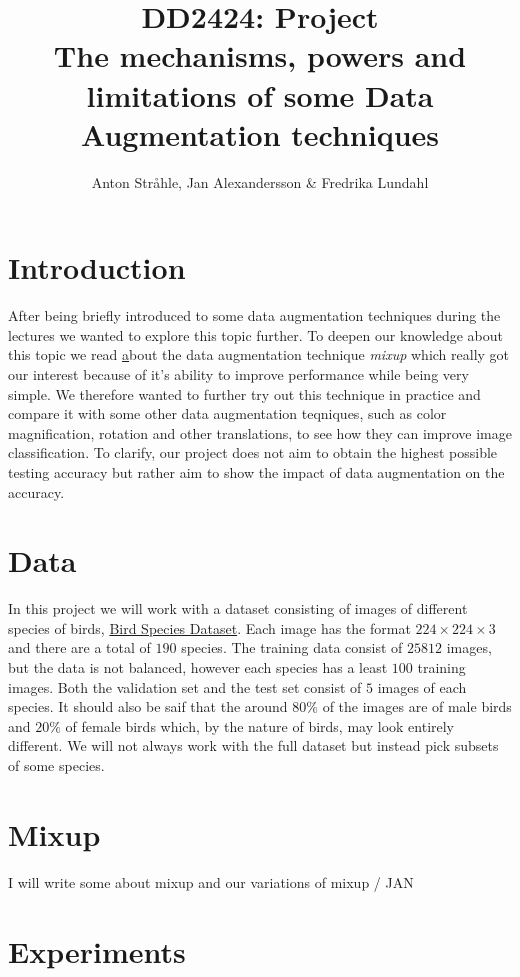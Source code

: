 \documentclass{article}
\begin{document}
\title{DD2424: Project \\
The mechanisms, powers and limitations of some Data Augmentation techniques}

\author{Anton Stråhle, Jan Alexandersson \& Fredrika Lundahl}
\maketitle 

\section{Introduction}

After being briefly introduced to some data augmentation techniques during the lectures we wanted to explore this topic further. 
To deepen our knowledge about this topic we read \href{https://arxiv.org/pdf/1710.09412.pdf} about the data augmentation technique \textit{mixup} which 
really got our interest because of it's ability to improve performance while being very simple. We therefore wanted to further try out this technique 
in practice and compare it with some other data augmentation teqniques, such as color magnification, rotation and other translations, to see how they can improve 
image classification. To clarify, our project does not aim to obtain the highest possible testing accuracy but rather aim to show the impact of data augmentation 
on the accuracy. 

\section{Data}

In this project we will work with a dataset consisting of images of different species of birds, 
\href{https://www.kaggle.com/gpiosenka/100-bird-species}{Bird Species Dataset}. Each image has the format $224 \times 224 \times 3$ and there are 
a total of $190$ species. The training data consist of $25812$ images, but the data is not balanced, however each species has a least $100$ training images. 
Both the validation set and the test set consist of $5$ images of each species. 
It should also be saif that the around $80\%$ of the images are of male birds and $20\%$ of female 
birds which, by the nature of birds, may look entirely different. 
We will not always work with the full dataset but instead pick subsets of some species. 

\section{Mixup}

I will write some about mixup and our variations of mixup / JAN



\section{Experiments}
\end{document}
